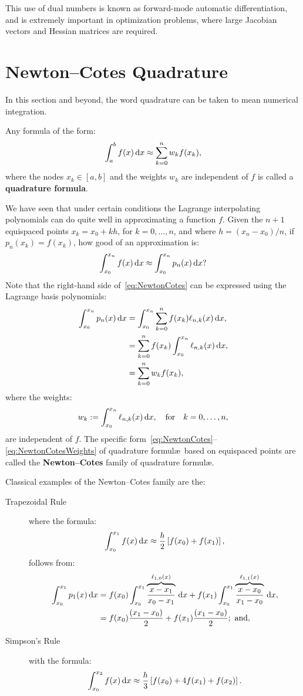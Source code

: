 This use of dual numbers is known as forward-mode automatic differentiation, and is extremely important in optimization problems, where large Jacobian vectors and Hessian matrices are required.

\section{Newton--Cotes Quadrature}

In this section and beyond, the word quadrature can be taken to mean numerical integration.
\begin{definition}
Any formula of the form:
\[
\int_a^b f(x){\rm\,d} x \approx \sum_{k=0}^n w_k f(x_k),
\]
where the nodes $x_k\in[a,b]$ and the weights $w_k$ are independent of $f$ is called a {\bf quadrature formula}.
\end{definition}
We have seen that under certain conditions the Lagrange interpolating polynomials can do quite well in approximating a function $f$. Given the $n+1$ equispaced points $x_k = x_0+kh$, for $k=0,\ldots,n$, and where $h=(x_n-x_0)/n$, if $p_n(x_k) = f(x_k)$, how good of an approximation is:
\begin{equation}\label{eq:NewtonCotes}
\int_{x_0}^{x_n} f(x){\rm\,d} x \approx \int_{x_0}^{x_n} p_n(x){\rm\,d} x ?
\end{equation}
Note that the right-hand side of~\eqref{eq:NewtonCotes} can be expressed using the Lagrange basis polynomials:
\begin{align}
\int_{x_0}^{x_n} p_n(x){\rm\,d} x & = \int_{x_0}^{x_n} \sum_{k=0}^n f(x_k) \ell_{n,k}(x){\rm\,d} x,\nonumber\\
& = \sum_{k=0}^n f(x_k) \int_{x_0}^{x_n} \ell_{n,k}(x){\rm\,d} x,\\
& = \sum_{k=0}^n w_k f(x_k),\nonumber
\end{align}
where the weights:
\begin{equation}\label{eq:NewtonCotesWeights}
w_k := \int_{x_0}^{x_n} \ell_{n,k}(x){\rm\,d} x,\quad{\rm for}\quad k=0,\ldots,n,
\end{equation}
are independent of $f$. The specific form~\eqref{eq:NewtonCotes}--\eqref{eq:NewtonCotesWeights} of quadrature formul\ae~based on equispaced points are called the {\bf Newton--Cotes} family of quadrature formul\ae.

Classical examples of the Newton--Cotes family are the:
\begin{description}
\item[Trapezoidal Rule] where the formula:
\[
\int_{x_0}^{x_1}f(x)\ud x \approx \dfrac{h}{2}\br[f(x_0)+f(x_1)],
\]
follows from:
\begin{align*}
\int_{x_0}^{x_1}p_1(x){\rm\,d} x & = f(x_0)\int_{x_0}^{x_1}\overbrace{\dfrac{x-x_1}{x_0-x_1}}^{\ell_{1,0}(x)}{\rm\,d} x + f(x_1)\int_{x_0}^{x_1}\overbrace{\dfrac{x-x_0}{x_1-x_0}}^{\ell_{1,1}(x)}{\rm\,d} x,\\
& = f(x_0)\dfrac{(x_1-x_0)}{2} + f(x_1)\dfrac{(x_1-x_0)}{2};\hbox{ and},
\end{align*}
\item[Simpson's Rule] with the formula:
\[
\int_{x_0}^{x_2}f(x)\ud x \approx \dfrac{h}{3}\br[f(x_0)+4f(x_1)+f(x_2)].
\]
\end{description}

